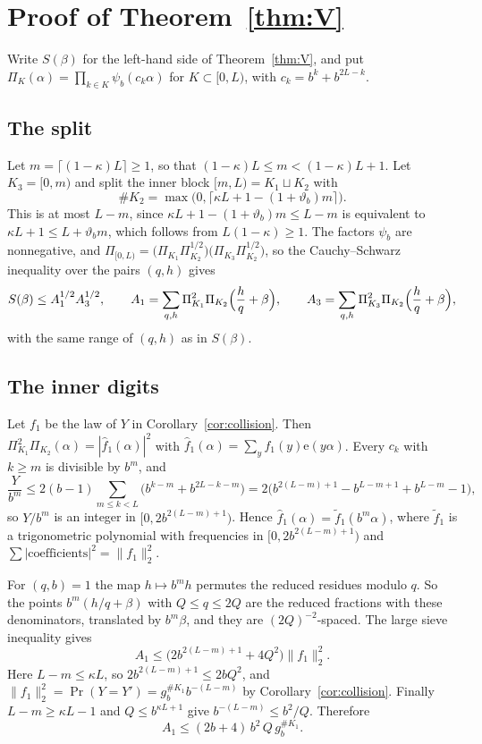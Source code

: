 \documentclass[11pt]{amsart}
\theoremstyle{definition}
\numberwithin{equation}{section}
\newcommand{\e}{\mathrm{e}}
\begin{document}
\section{Proof of Theorem~\ref{thm:V}}\label{sec:V}

Write $S(\beta)$ for the left-hand side of Theorem~\ref{thm:V}, and put $\Pi_K(\alpha)=\prod_{k\in K}\psi_b(c_k\alpha)$ for $K\subset[0,L)$, with $c_k=b^k+b^{2L-k}$.

\subsection{The split}
Let $m=\lceil(1-\kappa)L\rceil\ge1$, so that $(1-\kappa)L\le m<(1-\kappa)L+1$. Let $K_3=[0,m)$ and split the inner block $[m,L)=K_1\sqcup K_2$ with
\[
\#K_2=\max\bigl(0,\lceil\kappa L+1-(1+\vartheta_b)m\rceil\bigr).
\]
This is at most $L-m$, since $\kappa L+1-(1+\vartheta_b)m\le L-m$ is equivalent to $\kappa L+1\le L+\vartheta_bm$, which follows from $L(1-\kappa)\ge1$. The factors $\psi_b$ are nonnegative, and $\Pi_{[0,L)}=\bigl(\Pi_{K_1}\Pi_{K_2}^{1/2}\bigr)\bigl(\Pi_{K_3}\Pi_{K_2}^{1/2}\bigr)$, so the Cauchy--Schwarz inequality over the pairs $(q,h)$ gives
\[
S(\beta)\le A_1^{1/2}A_3^{1/2},\qquad A_1=\sum_{q,h}\Pi_{K_1}^2\Pi_{K_2}\Bigl(\frac hq+\beta\Bigr),\qquad A_3=\sum_{q,h}\Pi_{K_3}^2\Pi_{K_2}\Bigl(\frac hq+\beta\Bigr),
\]
with the same range of $(q,h)$ as in $S(\beta)$.

\subsection{The inner digits}
Let $f_1$ be the law of $Y$ in Corollary~\ref{cor:collision}. Then $\Pi_{K_1}^2\Pi_{K_2}(\alpha)=|\hat f_1(\alpha)|^2$ with $\hat f_1(\alpha)=\sum_yf_1(y)\e(y\alpha)$. Every $c_k$ with $k\ge m$ is divisible by $b^m$, and
\[
\frac{Y}{b^m}\le 2(b-1)\sum_{m\le k<L}\bigl(b^{k-m}+b^{2L-k-m}\bigr)=2\bigl(b^{2(L-m)+1}-b^{L-m+1}+b^{L-m}-1\bigr),
\]
so $Y/b^m$ is an integer in $[0,2b^{2(L-m)+1})$. Hence $\hat f_1(\alpha)=\tilde f_1(b^m\alpha)$, where $\tilde f_1$ is a trigonometric polynomial with frequencies in $[0,2b^{2(L-m)+1})$ and $\sum|\text{coefficients}|^2=\|f_1\|_2^2$.

For $(q,b)=1$ the map $h\mapsto b^mh$ permutes the reduced residues modulo $q$. So the points $b^m(h/q+\beta)$ with $Q\le q\le 2Q$ are the reduced fractions with these denominators, translated by $b^m\beta$, and they are $(2Q)^{-2}$-spaced. The large sieve inequality \cite[Thm.~7.7]{IK} gives
\[
A_1\le\bigl(2b^{2(L-m)+1}+4Q^2\bigr)\|f_1\|_2^2 .
\]
Here $L-m\le\kappa L$, so $2b^{2(L-m)+1}\le 2bQ^2$, and $\|f_1\|_2^2=\Pr(Y=Y')=g_b^{\#K_1}b^{-(L-m)}$ by Corollary~\ref{cor:collision}. Finally $L-m\ge\kappa L-1$ and $Q\le b^{\kappa L+1}$ give $b^{-(L-m)}\le b^2/Q$. Therefore
\begin{equation}\label{eq:A1}
A_1\le(2b+4)\,b^2\,Q\,g_b^{\#K_1}.
\end{equation}
\end{document}
